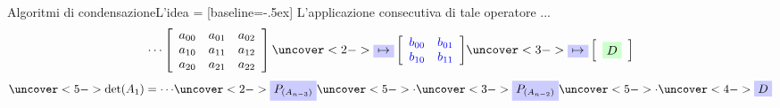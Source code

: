 \documentclass{beamer} %
\begin{document}
\begin{frame}{Algoritmi di condensazione}{L'idea}
 = [baseline=-.5ex]
L'applicazione consecutiva di tale operatore ...
\begin{displaymath}
	\cdots
		\left[ \begin{array}{ccc} a_{00} & a_{01} & a_{02} \\ a_{10} & a_{11} & a_{12} \\ a_{20} & a_{21} & a_{22}  \end{array} \right] 
\uncover<2->{
	\tikz[baseline]{ \node[fill=blue!20,anchor=base] (n1){$ \mapsto$}; }
		\left[ \begin{array}{cc} \color{blue}b_{00} & \color{blue}b_{01} \\ \color{blue}b_{10} & \color{blue}b_{11}  \end{array} \right] 
}
\uncover<3->{
	\tikz[baseline]{ \node[fill=blue!20,anchor=base] (n2){$ \mapsto$}; }
		\left[ \begin{array}{c} \tikz[baseline]{ \node[fill=green!20,anchor=base] (n3){$ D$}; }   \end{array} \right] 
}
\end{displaymath}
\newline
\begin{displaymath}
\uncover<5->{\mbox{det}(A_{1})= \cdots}	\uncover<2->{\tikz[baseline]{ \node[fill=blue!20,anchor=base] (t1){$ P_{(A_{n-3})}$}; }} \uncover<5->{\cdot} \uncover<3->{\tikz[baseline]{ \node[fill=blue!20,anchor=base] (t2){$ P_{(A_{n-2})}$}; }} \uncover<5->{\cdot}\uncover<4->{ \tikz[baseline]{ \node[fill=blue!20,anchor=base] (t3){$ D$}; }}
\end{displaymath}


\end{frame}
\end{document}
